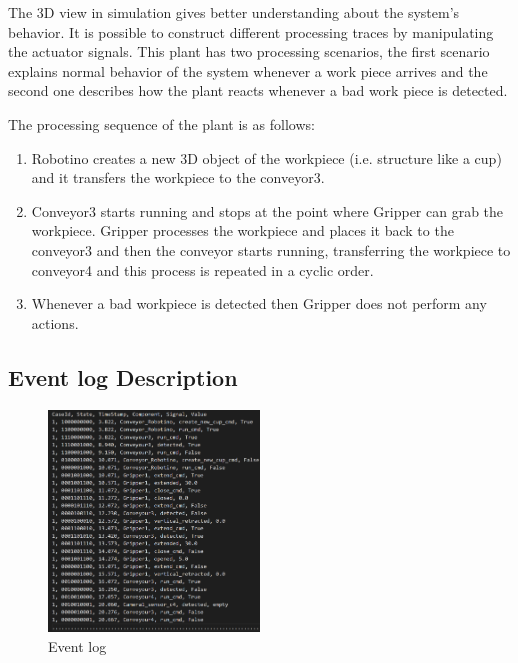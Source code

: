 \documentclass[conference]{IEEEtran}
\begin{document}
The 3D view in simulation gives better understanding about the system's behavior. It is possible to construct different processing traces by manipulating the  actuator signals. This plant has two processing scenarios, the first scenario explains normal behavior of the system whenever a work piece arrives and the second one describes how the plant reacts whenever a bad work piece is detected.

The  processing sequence of the plant is as follows: 

\begin{enumerate}

  \item Robotino creates a new 3D object of the workpiece (i.e. structure like a cup) and it transfers the workpiece to the conveyor3.  
  \item Conveyor3 starts running and stops at the point where Gripper can grab the workpiece. Gripper processes the workpiece and places it back to the conveyor3 and then the conveyor starts running, transferring the workpiece to conveyor4 and this process is repeated in a cyclic order.
  \item Whenever a bad workpiece is detected then Gripper does not perform any actions.
\end{enumerate}




\subsection{Event log Description}


\begin{figure}[!t]
	\centering
	\includegraphics[width=0.5\textwidth]{images/EL1.PNG}
	\caption{Event log}
	\label{SIM_EL}
\end{figure}
\end{document}
